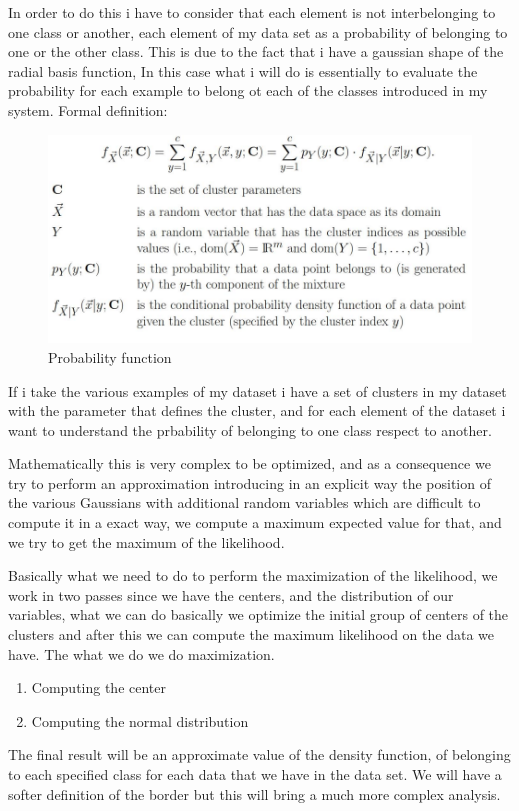 \documentclass{article}
\begin{document}
In order to do this i have to consider that each element is not interbelonging
to one class or another, each element of my data set as a probability of belonging to one or the other class.
This is due to the fact that i have a gaussian shape of the radial basis function,
In this case what i will do is essentially to evaluate the probability for each example to
belong ot each of the classes introduced in my system. Formal definition:
\begin{figure}[H]
    \centering
    \includegraphics[scale=0.4]{images/formal_prob_func.png}
    \caption{Probability function}
\end{figure}
If i take the various examples of my dataset i have a set of clusters in my dataset with the parameter that defines
the cluster, and for each element of the dataset i want to understand the prbability of belonging to
one class respect to another.

Mathematically this is very complex to be optimized, and as a consequence we try to perform an approximation introducing
in an explicit way the position of the various Gaussians with additional random variables which are difficult to
compute it in a exact way, we compute a maximum expected value for that, and we try to get the
maximum of the likelihood.

Basically what we need to do to perform the maximization of the likelihood, we work in two passes since we have the centers,
and the distribution of our variables, what we can do basically we optimize the initial group
of centers of the clusters and after this we can compute the maximum likelihood on the data we have.
The what we do we do maximization.
\begin{enumerate}
    \item Computing the center
    \item Computing the normal distribution
\end{enumerate}
The final result will be an approximate value of the density function, of belonging to each
specified class for each data that we have in the data set. We will have a softer definition of
the border but this will bring a much more complex analysis.
\end{document}
